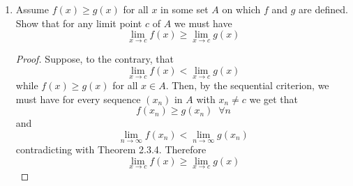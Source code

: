 \begin{enumerate}
\begin{proof}
\begin{enumerate}
        \item Let \( f: A \rightarrow \mathbb{R} \) and let there exist a sequence \( ( x_{n} ) \) such that \( x_{n} \in A \) and for every \( M > 0 \) there exists \( N \in \mathbb{N} \) such that \( x_{n} > M \) whenever \( n \geq N \). Then we say \( \lim_{ x \rightarrow \infty} f(x) = L \) when for every \( \epsilon > 0 \) there exists \( M > 0 \) such that whenever \( x > M \) (and \( x \in A\)) it follows that \( \vert f(x) - L \vert < \epsilon \). To demonstrate that \( \lim_{x\rightarrow \infty} \frac{1}{x} = 0 \) we let \( \epsilon > 0 \) be given. If \( x > \frac{1}{\epsilon} \) then
        \[
        \left| \frac{1}{x} \right| = \frac{1}{\vert x \vert} < \frac{1}{\frac{1}{\epsilon}} = \epsilon
        \]
        as desired.
        
        \item Let \( f: A \rightarrow \mathbb{R} \) and let there exist a sequence \( ( x_{n} ) \) such that \( x_{n} \in A \) and for every \( M > 0 \) there exists \( N \in \mathbb{N} \) such that \( x_{n} > M \) whenever \( n \geq N \). We say \( \lim_{x \rightarrow c} f(x) = \infty \) provided that, for all \( \epsilon > 0 \), there exists \( M > 0 \) such that whenever \( x > M\) (and \( x \in A \)) it follows that \( \vert f(x) \vert > \epsilon \). For example we claim \( \lim_{x \rightarrow \infty} x = \infty \). To demonstrate, let \( \epsilon > 0 \) be given. Then, selecting \( x > \epsilon \) we get that
        \[
        \vert x \vert = x > \epsilon
        \]
        Therefore, \( \lim_{x \rightarrow \infty} x = \infty \). 
    \end{enumerate}
    \end{proof}
    
    \item Assume \( f(x) \geq g(x) \) for all \( x \) in some set \( A \) on which \(f \) and \( g \) are defined. Show that for any limit point \( c \) of \( A \) we must have
    \[
    \lim_{x \rightarrow c} f(x) \geq \lim_{x \rightarrow c} g(x)
    \]
    
    \begin{proof}
    Suppose, to the contrary, that
    \[
    \lim_{x \rightarrow c} f(x) < \lim_{x \rightarrow c} g(x)
    \]
    while \( f(x) \geq g(x) \) for all \( x \in A \). Then, by the sequential criterion, we must have for every sequence \( (x_{n}) \) in \( A \) with \( x_{n} \neq c \) we get that
    \[
    f(x_{n}) \geq g(x_{n}) \;\; \forall n
    \]
    and
    \[
    \lim_{n \rightarrow \infty} f(x_{n}) < \lim_{n \rightarrow \infty} g(x_{n})
    \]
    contradicting with Theorem 2.3.4. Therefore
    \[
    \lim_{x \rightarrow c} f(x) \geq \lim_{x \rightarrow c} g(x)
    \]
    \end{proof}
    

\end{enumerate}
